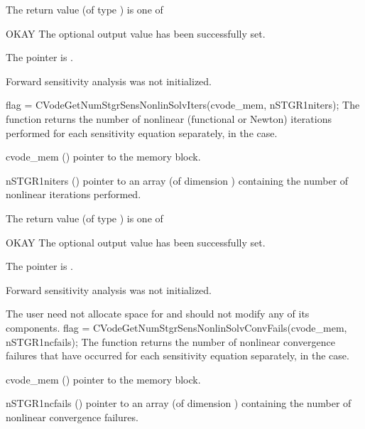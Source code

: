 {
  The return value  (of type ) is one of
  \begin{args}
  \item[OKAY] 
    The optional output value has been successfully set.
  \item[\Id{CVG\_NO\_MEM}]
    The  pointer is .
  \item[\Id{CVG\_NO\_SENS}]
    Forward sensitivity analysis was not initialized.
  \end{args}
}
{}
{
  flag = CVodeGetNumStgrSensNonlinSolvIters(cvode\_mem, nSTGR1niters);
}
{
  The function  returns the
  number of nonlinear (functional or Newton) iterations performed for 
  each sensitivity equation separately, in the  case.
}
{
  \begin{args}
  \item[cvode\_mem] ()
    pointer to the {\cvodes} memory block.
  \item[nSTGR1niters] ()
    pointer to an array (of dimension ) containing the number of 
    nonlinear iterations performed.
  \end{args}
}
{
  The return value  (of type ) is one of
  \begin{args}
  \item[OKAY] 
    The optional output value has been successfully set.
  \item[\Id{CVG\_NO\_MEM}]
    The  pointer is .
  \item[\Id{CVG\_NO\_SENS}]
    Forward sensitivity analysis was not initialized.
  \end{args}
}
{
  The user need not allocate space for  and should not modify
  any of its components.
}
{
  flag = CVodeGetNumStgrSensNonlinSolvConvFails(cvode\_mem, nSTGR1ncfails);
}
{
  The function  returns the
  number of nonlinear convergence failures that have occurred for
  each sensitivity equation separately, in the  case.
}
{
  \begin{args}
  \item[cvode\_mem] ()
    pointer to the {\cvodes} memory block.
  \item[nSTGR1ncfails] ()
    pointer to an array (of dimension ) containing the 
    number of nonlinear convergence failures.
  \end{args}
}
